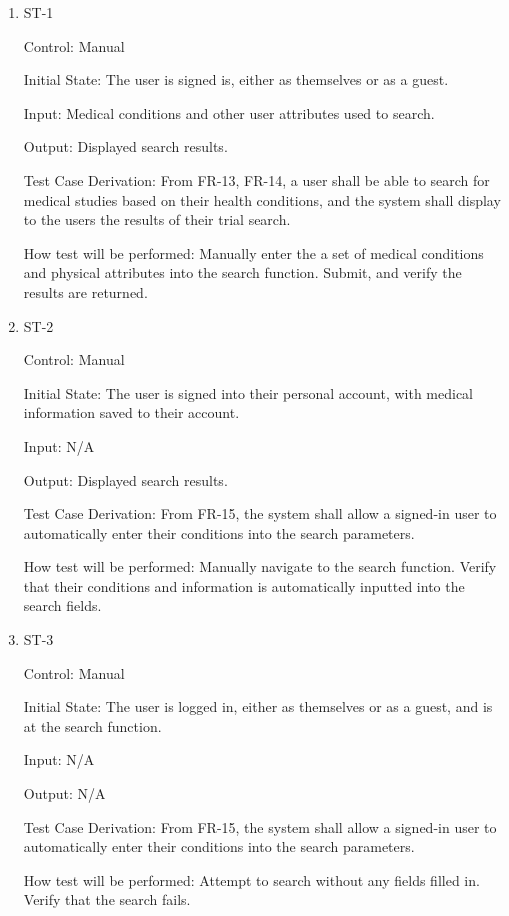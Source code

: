 \documentclass[12pt, titlepage]{article}
\begin{document}
\begin{enumerate}

\item{ST-1\\}

Control: Manual
					
Initial State: The user is signed is, either as themselves or as a guest.
					
Input: Medical conditions and other user attributes used to search.
					
Output: Displayed search results.

Test Case Derivation: From FR-13, FR-14, a user shall be able to search for medical studies based on their health conditions, and the system shall display to the users the results of their trial search.

How test will be performed: Manually enter the a set of medical conditions and physical attributes into the search function. Submit, and verify the results are returned.


\item{ST-2\\}

Control: Manual
					
Initial State: The user is signed into their personal account, with medical information saved to their account.
					
Input: N/A
					
Output: Displayed search results.

Test Case Derivation: From FR-15, the system shall allow a signed-in user to automatically enter their conditions into the search parameters.

How test will be performed: Manually navigate to the search function. Verify that their conditions and information is automatically inputted into the search fields.


\item{ST-3\\}

Control: Manual
					
Initial State: The user is logged in, either as themselves or as a guest, and is at the search function.
					
Input: N/A
					
Output: N/A

Test Case Derivation: From FR-15, the system shall allow a signed-in user to automatically enter their conditions into the search parameters.

How test will be performed: Attempt to search without any fields filled in. Verify that the search fails.


\end{enumerate}
\end{document}
